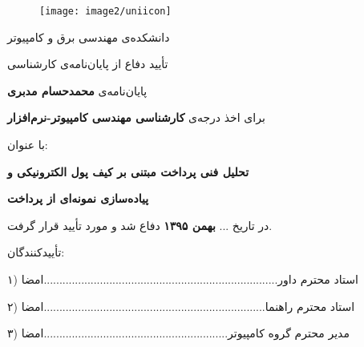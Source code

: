 \documentclass[oneside]{report}
\begin{document}
\newpage

\begin{figure}[h]
	\centering
	\texttt{[image: image2/uniicon]}
\end{figure}

\begin{center}
	{\LARGE دانشکده‌ی مهندسی برق و کامپیوتر}
	
	\vspace*{1.5cm}
	
	{\LARGE تأیید دفاع از پایان‌نامه‌ی کارشناسی}
	
	\vspace*{0.5cm}
	
	{\LARGE پایان‌نامه‌ی}
	\textbf{\LARGE محمد‌حسام مدبری}
	
	\vspace*{1.5cm}
	
	{\LARGE برای اخذ درجه‌ی }
	\textbf{\LARGE کارشناسی مهندسی کامپیوتر-نرم‌افزار}
	
	\vspace*{1.2cm}
	
	{\LARGE با عنوان: }
	
\vspace*{1cm}
	
	\textbf{\huge تحلیل فنی پرداخت مبتنی بر کیف پول الکترونیکی و}
	
	\vspace*{0.4cm}
	
	\textbf{\huge پیاده‌سازی نمونه‌ای از پرداخت}
	
	\vspace*{1cm}
	
	{\LARGE در تاریخ ... }
	\textbf{\LARGE بهمن ۱۳۹۵}
	{\LARGE دفاع شد و مورد تأیید قرار گرفت.}
	
	\vspace*{1.7cm}
	
	{\LARGE تأییدکنندگان:}
	
	\vspace*{0.7cm}
	
	{\LARGE  ۱) استاد محترم داور...........................................................................امضا}

		\vspace*{0.7cm}
		
	{\LARGE ۲) استاد محترم راهنما.......................................................................امضا}
		
			\vspace*{0.7cm}
	
	{\LARGE ۳) مدیر محترم گروه کامپیوتر...........................................................امضا}
	
\end{center}
\end{document}
